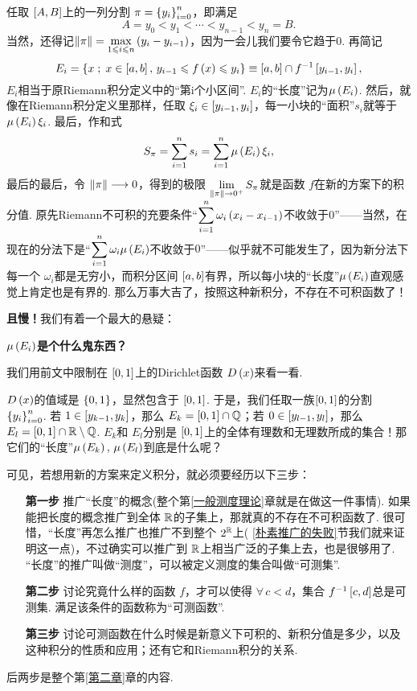 任取 $\left[A,B\right]$上的一列分割 $\pi=\left\{y_i\right\}_{i=0}^n$，即满足
\[   A=y_0<y_1<\cdots<y_{n-1}<y_n=B.   \]
当然，还得记$\displaystyle \left\|\pi\right\|= \max_{1\leqslant i\leqslant n}\left( y_i-y_{i-1} \right)$，因为一会儿我们要令它趋于$0$. 再简记
\[   E_i = \left\{   x\;;\;x\in\left[a,b\right],\, y_{i-1}\leqslant f\left(x\right) \leqslant y_i \right\} \equiv \left[a,b\right]\cap f^{-1}\left[y_{i-1},y_i\right],   \]
$E_i$相当于原Riemann积分定义中的“第i个小区间”. $E_i$的“长度”记为$\mu\left(E_i\right)$. 然后，就像在Riemann积分定义里那样，任取 $\xi_i\in\left[y_{i-1},y_i\right]$，每一小块的“面积”$s_i$就等于$\mu\left(E_i\right)\xi_i$. 最后，作和式
\[   S_\pi=\sum_{i=1}^n s_i = \sum_{i=1}^n \mu\left(E_i\right)\xi_i,   \]
最后的最后，令 $\left\|\pi\right\| \longrightarrow 0$，得到的极限 $\displaystyle \lim_{\left\|\pi\right\|\to 0^+} S_\pi $就是函数 $f$在新的方案下的积分值. 原先Riemann不可积的充要条件“$\displaystyle \sum_{i=1}^n\omega_i\left(x_i-x_{i-1}\right)$不收敛于$0$”——当然，在现在的分法下是“$\displaystyle \sum_{i=1}^n\omega_i\mu\left(E_i\right)$不收敛于$0$”——似乎就不可能发生了，因为新分法下每一个 $\omega_i$都是无穷小，而积分区间 $\left[a,b\right]$有界，所以每小块的“长度”$\mu\left(E_i\right)$直观感觉上肯定也是有界的. 那么万事大吉了，按照这种新积分，不存在不可积函数了！

\textbf{且慢！}我们有着一个最大的悬疑：
\begin{center}
    \textbf{$\mu\left(E_i\right)$是个什么鬼东西？}
\end{center}
我们用前文中限制在 $\left[0,1\right]$上的Dirichlet函数 $D\left(x\right)$来看一看.

$D\left(x\right)$的值域是 $\left\{0,1\right\}$，显然包含于 $\left[0,1\right]$. 于是，我们任取一族$\left[0,1\right]$的分割 $\left\{y_i\right\}_{i=0}^n$. 若 $1\in\left[y_{k-1},y_k\right]$，那么 $E_k=\left[0,1\right]\cap\mathbb{Q}$；若 $0\in\left[y_{l-1},y_l\right]$，那么 $E_l=\left[0,1\right]\cap\mathbb{R}\setminus\mathbb{Q}$. $E_k$和 $E_l$分别是 $\left[0,1\right]$上的全体有理数和无理数所成的集合！那它们的“长度”$\mu\left(E_k\right),\,\mu\left(E_l\right)$到底是什么呢？

可见，若想用新的方案来定义积分，就必须要经历以下三步：
\begin{itemize}
    \item[\textbf{第一步}] 推广“长度”的概念(整个第\ref{一般测度理论}章就是在做这一件事情). 如果能把长度的概念推广到全体 $\mathbb{R}$的子集上，那就真的不存在不可积函数了. 很可惜，“长度”再怎么推广也推广不到整个 $2^{\mathbb{R}}$上( \ref{朴素推广的失败}节我们就来证明这一点)，不过确实可以推广到 $\mathbb{R}$上相当广泛的子集上去，也是很够用了. “长度”的推广叫做“测度”，可以被定义测度的集合叫做“可测集”.
    \item[\textbf{第二步}] 讨论究竟什么样的函数 $f$，才可以使得 $\forall\,c<d$，集合 $f^{-1}\left[c,d\right]$总是可测集. 满足该条件的函数称为“可测函数”.
    \item[\textbf{第三步}] 讨论可测函数在什么时候是新意义下可积的、新积分值是多少，以及这种积分的性质和应用；还有它和Riemann积分的关系.
\end{itemize}
后两步是整个第\ref{第二章}章的内容.



